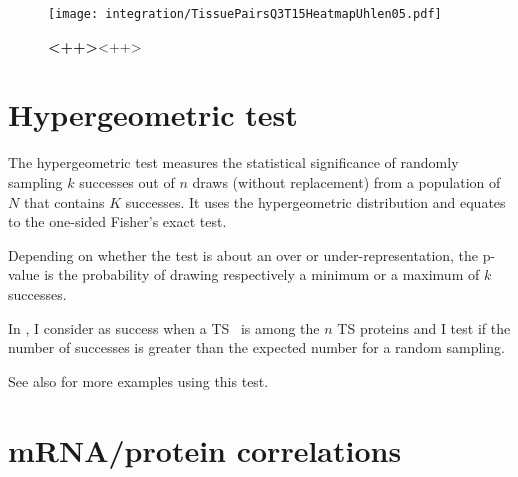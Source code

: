\begin{figure}[!htb]
    \texttt{[image: integration/TissuePairsQ3T15HeatmapUhlen05.pdf]}\centering
    \caption[Heatmap]{\label{fig:heatmapUhlenTissuePairs05}\textbf{<++>}<++>}
\end{figure}


\section{Hypergeometric test}\label{sec:hypergeometricTest}

The hypergeometric test measures the statistical significance of
randomly sampling $k$ successes out of $n$ draws (without replacement)
from a population of $N$ that contains $K$ successes.
It uses the hypergeometric distribution
and equates to the one-sided Fisher's exact test.

Depending on whether the test is about an over or under-representation,
the p-value is the probability of drawing respectively a minimum or a maximum
of $k$ successes.

In ,
I consider as success when a \gls{TS} \mRNA\ is among the $n$ \gls{TS} proteins
and I test if the number of successes is greater than
the expected number for a random sampling.

See also \citet{Johnson2005-mf} for more examples using this test.



\clearpage



\normalsize


\pagestyle{scrheadings}


\section{mRNA/protein correlations}\label{app:geneCentric}


